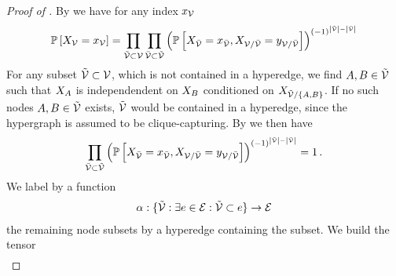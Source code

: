 \begin{proof}[Proof of ]
    By  we have for any index $x_{\mathcal{V}}$
    \begin{align*}
        \mathbb{P}\left[X_{\mathcal{V}}=x_{\mathcal{V}}\right] =
        \prod_{\tilde{\mathcal{V}}\subset\mathcal{V}} \prod_{\bar{\mathcal{V}}\subset\tilde{\mathcal{V}}}
        \left(
        \mathbb{P}\left[X_{\bar{\mathcal{V}}}=x_{\bar{\mathcal{V}}},X_{\mathcal{V}/\bar{\mathcal{V}}}=y_{\mathcal{V}/\bar{\mathcal{V}}}\right]
        \right)^{(-1)^{\left|\tilde{\mathcal{V}}\right|-\left|\bar{\mathcal{V}}\right|}}
    \end{align*}
    For any subset $\tilde{\mathcal{V}}\subset\mathcal{V}$, which is not contained in a hyperedge, we find $A,B \in\tilde{\mathcal{V}}$ such that $X_{A}$ is independendent on $X_{B}$ conditioned on $X_{\tilde{\mathcal{V}}/\{A,B\}}$.
    If no such nodes $A,B \in\tilde{\mathcal{V}}$ exists, $\tilde{\mathcal{V}}$ would be contained in a hyperedge, since the hypergraph is assumed to be clique-capturing.
    By  we then have
    \begin{align*}
        \prod_{\bar{\mathcal{V}}\subset\tilde{\mathcal{V}}}
        \left(
        \mathbb{P}\left[X_{\bar{\mathcal{V}}}=x_{\bar{\mathcal{V}}},X_{\mathcal{V}/\bar{\mathcal{V}}}=y_{\mathcal{V}/\bar{\mathcal{V}}}\right]
        \right)^{(-1)^{\left|\tilde{\mathcal{V}}\right|-\left|\bar{\mathcal{V}}\right|}} = 1 \, .
    \end{align*}
    We label by a function
    \begin{align*}
        \alpha: \{\tilde{\mathcal{V}} : \exists e\in\mathcal{E}: \tilde{\mathcal{V}} \subset e \} \rightarrow \mathcal{E}
    \end{align*}
    the remaining node subsets by a hyperedge containing the subset.
    We build the tensor
    \begin{align*}

\end{align*}
\end{proof}
